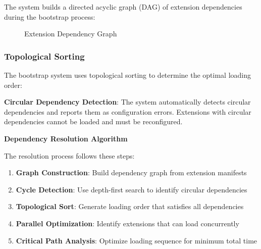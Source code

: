 The system builds a directed acyclic graph (DAG) of extension dependencies during the bootstrap process:

\begin{figure}[h]
\centering
{}
\caption{Extension Dependency Graph}
\label{fig:dependency-graph}
\end{figure}

\subsubsection{Topological Sorting}

The bootstrap system uses topological sorting to determine the optimal loading order:

\begin{alertbox}
\textbf{Circular Dependency Detection}: The system automatically detects circular dependencies and reports them as configuration errors. Extensions with circular dependencies cannot be loaded and must be reconfigured.
\end{alertbox}

\textbf{Dependency Resolution Algorithm}

The resolution process follows these steps:

\begin{enumerate}
    \item \textbf{Graph Construction}: Build dependency graph from extension manifests
    \item \textbf{Cycle Detection}: Use depth-first search to identify circular dependencies
    \item \textbf{Topological Sort}: Generate loading order that satisfies all dependencies
    \item \textbf{Parallel Optimization}: Identify extensions that can load concurrently
    \item \textbf{Critical Path Analysis}: Optimize loading sequence for minimum total time
\end{enumerate}

